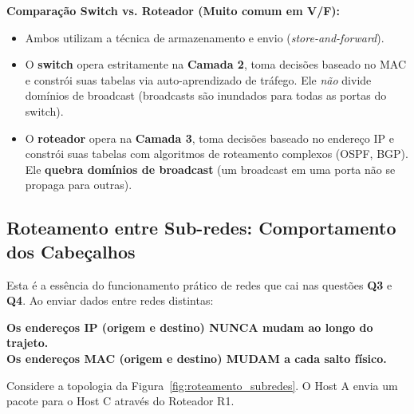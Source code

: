 \documentclass[11pt,a4paper]{article}
\begin{document}
\begin{reflexao}
\textbf{Comparação Switch vs. Roteador (Muito comum em V/F):}
\begin{itemize}
    \item Ambos utilizam a técnica de armazenamento e envio (\emph{store-and-forward}).
    \item O \textbf{switch} opera estritamente na \textbf{Camada 2}, toma decisões baseado no MAC e constrói suas tabelas via auto-aprendizado de tráfego. Ele \emph{não} divide domínios de broadcast (broadcasts são inundados para todas as portas do switch).
    \item O \textbf{roteador} opera na \textbf{Camada 3}, toma decisões baseado no endereço IP e constrói suas tabelas com algoritmos de roteamento complexos (OSPF, BGP). Ele \textbf{quebra domínios de broadcast} (um broadcast em uma porta não se propaga para outras).
\end{itemize}
\end{reflexao}

\subsection{Roteamento entre Sub-redes: Comportamento dos Cabeçalhos}

Esta é a essência do funcionamento prático de redes que cai nas questões \textbf{Q3} e \textbf{Q4}. Ao enviar dados entre redes distintas:
\begin{center}
    \textbf{Os endereços IP (origem e destino) NUNCA mudam ao longo do trajeto.} \\
    \textbf{Os endereços MAC (origem e destino) MUDAM a cada salto físico.}
\end{center}

Considere a topologia da Figura~\ref{fig:roteamento_subredes}. O Host A envia um pacote para o Host C através do Roteador R1.
\end{document}
